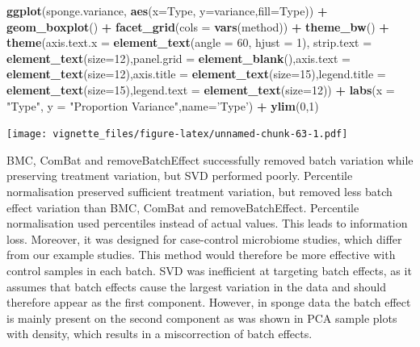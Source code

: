 \documentclass[]{book}
\newenvironment{Shaded}{\begin{snugshade}}{\end{snugshade}}
\newcommand{\KeywordTok}[1]{\textcolor[rgb]{0.13,0.29,0.53}{\textbf{#1}}}
\newcommand{\DataTypeTok}[1]{\textcolor[rgb]{0.13,0.29,0.53}{#1}}
\newcommand{\DecValTok}[1]{\textcolor[rgb]{0.00,0.00,0.81}{#1}}
\newcommand{\StringTok}[1]{\textcolor[rgb]{0.31,0.60,0.02}{#1}}
\newcommand{\OperatorTok}[1]{\textcolor[rgb]{0.81,0.36,0.00}{\textbf{#1}}}
\newcommand{\NormalTok}[1]{#1}
\begin{document}
\begin{Shaded}
\begin{Highlighting}[]
\KeywordTok{ggplot}\NormalTok{(sponge.variance, }\KeywordTok{aes}\NormalTok{(}\DataTypeTok{x=}\NormalTok{Type, }\DataTypeTok{y=}\NormalTok{variance,}\DataTypeTok{fill=}\NormalTok{Type)) }\OperatorTok{+}\StringTok{ }\KeywordTok{geom_boxplot}\NormalTok{() }\OperatorTok{+}\StringTok{ }\KeywordTok{facet_grid}\NormalTok{(}\DataTypeTok{cols =} \KeywordTok{vars}\NormalTok{(method)) }\OperatorTok{+}\StringTok{ }\KeywordTok{theme_bw}\NormalTok{() }\OperatorTok{+}\StringTok{ }\KeywordTok{theme}\NormalTok{(}\DataTypeTok{axis.text.x =} \KeywordTok{element_text}\NormalTok{(}\DataTypeTok{angle =} \DecValTok{60}\NormalTok{, }\DataTypeTok{hjust =} \DecValTok{1}\NormalTok{), }\DataTypeTok{strip.text =} \KeywordTok{element_text}\NormalTok{(}\DataTypeTok{size=}\DecValTok{12}\NormalTok{),}\DataTypeTok{panel.grid =} \KeywordTok{element_blank}\NormalTok{(),}\DataTypeTok{axis.text =} \KeywordTok{element_text}\NormalTok{(}\DataTypeTok{size=}\DecValTok{12}\NormalTok{),}\DataTypeTok{axis.title =} \KeywordTok{element_text}\NormalTok{(}\DataTypeTok{size=}\DecValTok{15}\NormalTok{),}\DataTypeTok{legend.title =} \KeywordTok{element_text}\NormalTok{(}\DataTypeTok{size=}\DecValTok{15}\NormalTok{),}\DataTypeTok{legend.text =} \KeywordTok{element_text}\NormalTok{(}\DataTypeTok{size=}\DecValTok{12}\NormalTok{)) }\OperatorTok{+}\StringTok{ }\KeywordTok{labs}\NormalTok{(}\DataTypeTok{x =} \StringTok{"Type"}\NormalTok{, }\DataTypeTok{y =} \StringTok{"Proportion Variance"}\NormalTok{,}\DataTypeTok{name=}\StringTok{'Type'}\NormalTok{) }\OperatorTok{+}\StringTok{ }\KeywordTok{ylim}\NormalTok{(}\DecValTok{0}\NormalTok{,}\DecValTok{1}\NormalTok{)}
\end{Highlighting}
\end{Shaded}

\texttt{[image: vignette\_files/figure-latex/unnamed-chunk-63-1.pdf]}

BMC, ComBat and removeBatchEffect successfully removed batch variation
while preserving treatment variation, but SVD performed poorly.
Percentile normalisation preserved sufficient treatment variation, but
removed less batch effect variation than BMC, ComBat and
removeBatchEffect. Percentile normalisation used percentiles instead of
actual values. This leads to information loss. Moreover, it was designed
for case-control microbiome studies, which differ from our example
studies. This method would therefore be more effective with control
samples in each batch. SVD was inefficient at targeting batch effects,
as it assumes that batch effects cause the largest variation in the data
and should therefore appear as the first component. However, in sponge
data the batch effect is mainly present on the second component as was
shown in PCA sample plots with density, which results in a miscorrection
of batch effects.
\end{document}
